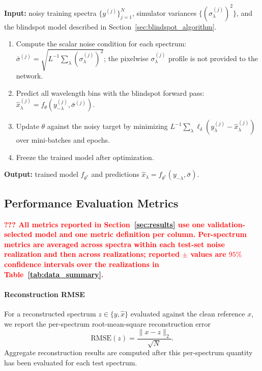 \documentclass[twocolumn]{aastex7}
\newcommand{\algkey}[1]{\textcolor{BlindspotBlue}{\textbf{#1}}}
\newcommand{\ld}[1]{\textcolor{red}{\textbf{#1}}}
\newcounter{algorithm}
\newcounter{protocol}
\renewcommand{\theprotocol}{\arabic{protocol}}
\newenvironment{protocolblock}[1]{%
    \refstepcounter{protocol}%
    \begin{tcolorbox}[
        colback=BlindspotBack,
        colframe=BlindspotBlue,
        coltitle=black,
        colbacktitle=BlindspotTitle,
        fonttitle=\bfseries,
        title={Protocol~\theprotocol. #1},
        boxrule=0.55pt,
        arc=2pt,
        left=0.8em,
        right=0.8em,
        top=0.45em,
        bottom=0.45em,
        before skip=0.8\baselineskip,
        after skip=0.8\baselineskip
    ]
    \small
    \raggedright
}{%
    \end{tcolorbox}
}
\begin{document}
\begin{protocolblock}{Training protocol for the reported blindspot model}
\label{prot:blindspot_training}
\noindent\algkey{Input:} noisy training spectra $\{y^{(j)}\}_{j=1}^{N}$, simulator variances $\{(\sigma_{\lambda}^{(j)})^{2}\}$, and the blindspot model described in Section~\ref{sec:blindspot_algorithm}.
\begin{enumerate}
    \item Compute the scalar noise condition for each spectrum:
    $\bar{\sigma}^{(j)}=\sqrt{L^{-1}\sum_{\lambda}(\sigma_{\lambda}^{(j)})^{2}}$; the pixelwise $\sigma_{\lambda}^{(j)}$ profile is not provided to the network.
    \item Predict all wavelength bins with the blindspot forward pass:
    $\hat{x}_{\lambda}^{(j)}=f_{\theta}(y_{-\lambda}^{(j)},\bar{\sigma}^{(j)})$.
    \item Update $\theta$ against the noisy target by minimizing
    $L^{-1}\sum_{\lambda}\ell_{\delta}(y_{\lambda}^{(j)}-\hat{x}_{\lambda}^{(j)})$ over mini-batches and epochs.
    \item Freeze the trained model after optimization.
\end{enumerate}
\noindent\algkey{Output:} trained model $f_{\theta^\ast}$ and predictions $\hat{x}_{\lambda}=f_{\theta^\ast}(y_{-\lambda},\bar{\sigma})$.
\end{protocolblock}

\subsection{Performance Evaluation Metrics}

\ld{??? All metrics reported in Section~\ref{sec:results} use one validation-selected model and one metric definition per column. Per-spectrum metrics are averaged across spectra within each test-set noise realization and then across realizations; reported $\pm$ values are $95\%$ confidence intervals over the realizations in Table~\ref{tab:data_summary}.}

\paragraph{Reconstruction RMSE} For a reconstructed spectrum $z\in\{y,\hat{x}\}$ evaluated against the clean reference $x$, we report the per-spectrum root-mean-square reconstruction error
\begin{equation}
    \mathrm{RMSE}(z)
    =
    \frac{\lVert x-z\rVert_{2}}{\sqrt{N}}.
    \label{eq:rmse_def}
\end{equation}
Aggregate reconstruction results are computed after this per-spectrum quantity has been evaluated for each test spectrum.
\end{document}
